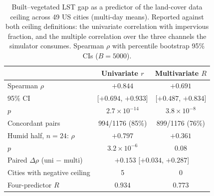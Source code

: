 \begin{table}[ht]
  \centering
  \caption{Built--vegetated LST gap as a predictor of the land-cover
  data ceiling across 49 US cities (multi-day means). Reported
  against both ceiling definitions: the univariate correlation with
  impervious fraction, and the multiple correlation over the three
  channels the simulator consumes. Spearman $\rho$ with percentile
  bootstrap 95\% CIs ($B=5000$).}
  \label{tab:gap_dual}
  \small
  \begin{tabular}{lcc}
    \toprule
    & Univariate $r$ & Multivariate $R$ \\
    \midrule
    Spearman $\rho$ & $+0.844$ & $+0.691$ \\
    95\% CI & [$+0.694$, $+0.933$] & [$+0.487$, $+0.834$] \\
    $p$ & $2.7\times10^{-14}$ & $3.8\times10^{-8}$ \\
    Concordant pairs & 994/1176 (85\%) & 899/1176 (76\%) \\
    \midrule
    Humid half, $n=24$: $\rho$ & $+0.797$ & $+0.361$ \\
    \quad $p$ & $3.2\times10^{-6}$ & $0.08$ \\
    \midrule
    Paired $\Delta\rho$ (uni $-$ multi) & \multicolumn{2}{c}{$+0.153$ [$+0.034$, $+0.287$]} \\
    Cities with negative ceiling & 5 & 0 \\
    Four-predictor $R$ & $0.934$ & $0.773$ \\
    \bottomrule
  \end{tabular}
\end{table}
